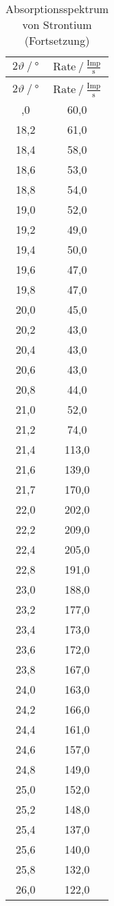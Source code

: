 \begin{longtable}{ S S }
   \caption{Absorptionsspektrum von Strontium}
   \label{tab:stro} \\
    \toprule
 {$2\vartheta\:/\: \mathrm{°}$} & {$\text{Rate}\:/\: \mathrm{\frac{Imp}{s}}$} \\
    \midrule
  \endfirsthead
    \caption{Absorptionsspektrum von Strontium (Fortsetzung)} \\
    \toprule
 {$2\vartheta\:/\: \mathrm{°}$} & {$\text{Rate}\:/\: \mathrm{\frac{Imp}{s}}$} \\
    \midrule
  \endhead
    \midrule
  \endfoot
    \bottomrule
  ,0 & 60,0 \\
    18,2 & 61,0 \\
    18,4 & 58,0 \\
    18,6 & 53,0 \\
    18,8 & 54,0 \\
    19,0 & 52,0 \\
    19,2 & 49,0 \\
    19,4 & 50,0 \\
    19,6 & 47,0 \\
    19,8 & 47,0 \\
    20,0 & 45,0 \\
    20,2 & 43,0 \\
    20,4 & 43,0 \\
    20,6 & 43,0 \\
    20,8 & 44,0 \\
    21,0 & 52,0 \\
    21,2 & 74,0 \\
    21,4 & 113,0 \\
    21,6 & 139,0 \\
    21,7 & 170,0 \\
    22,0 & 202,0 \\
    22,2 & 209,0 \\
    22,4 & 205,0 \\
    22,8 & 191,0 \\
    23,0 & 188,0 \\
    23,2 & 177,0 \\
    23,4 & 173,0 \\
    23,6 & 172,0 \\
    23,8 & 167,0 \\
    24,0 & 163,0 \\
    24,2 & 166,0 \\
    24,4 & 161,0 \\
    24,6 & 157,0 \\
    24,8 & 149,0 \\
    25,0 & 152,0 \\
    25,2 & 148,0 \\
    25,4 & 137,0 \\
    25,6 & 140,0 \\
    25,8 & 132,0 \\
    26,0 & 122,0 \\
\end{longtable}
